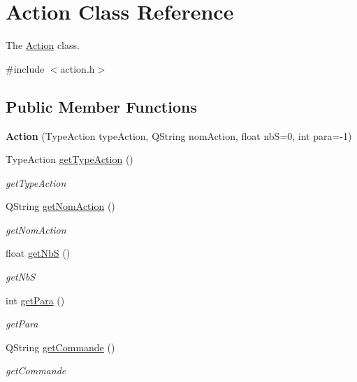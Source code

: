 \hypertarget{classAction}{\section{Action Class Reference}
\label{classAction}
}


The \hyperlink{classAction}{Action} class.  




{\ttfamily \#include $<$action.\-h$>$}

\subsection*{Public Member Functions}
\begin{DoxyCompactItemize}
\item 
\hypertarget{classAction_ab5e3e2eccd22907a79594b656bf7ab32}{{\bfseries Action} (Type\-Action type\-Action, Q\-String nom\-Action, float nb\-S=0, int para=-\/1)}\label{classAction_ab5e3e2eccd22907a79594b656bf7ab32}

\item 
Type\-Action \hyperlink{classAction_ac66273a7563065cb7c87c940feada373}{get\-Type\-Action} ()
\begin{DoxyCompactList}\small\item\em get\-Type\-Action \end{DoxyCompactList}\item 
Q\-String \hyperlink{classAction_a8e575611eecd9a35dc72395c35a241f8}{get\-Nom\-Action} ()
\begin{DoxyCompactList}\small\item\em get\-Nom\-Action \end{DoxyCompactList}\item 
float \hyperlink{classAction_accf77c466ee2a4c6937c74b9ecef1ba9}{get\-Nb\-S} ()
\begin{DoxyCompactList}\small\item\em get\-Nb\-S \end{DoxyCompactList}\item 
int \hyperlink{classAction_a8c28cb33dd599bff50cdd7eaf0be85cc}{get\-Para} ()
\begin{DoxyCompactList}\small\item\em get\-Para \end{DoxyCompactList}\item 
Q\-String \hyperlink{classAction_a2823596af843bae1a16d1b89ee4b3c2f}{get\-Commande} ()
\begin{DoxyCompactList}\small\item\em get\-Commande \end{DoxyCompactList}\end{DoxyCompactItemize}


